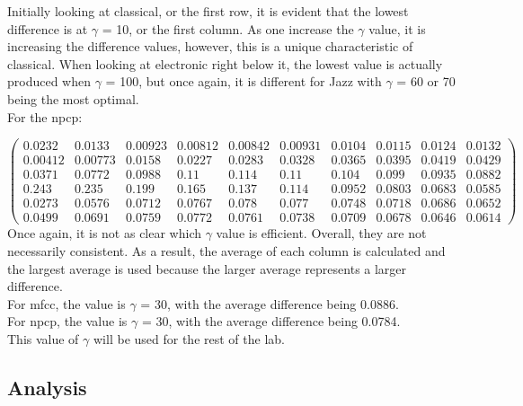 \documentclass[11pt, a4paper]{article}
\begin{document}
Initially looking at classical, or the first row, it is evident that the lowest difference is at $\gamma$ = 10, or the first column. As one increase the $\gamma$ value, it is increasing the difference values, however, this is a unique characteristic of classical. When looking at electronic right below it, the lowest value is actually produced when $\gamma$ = 100, but once again, it is different for Jazz with $\gamma$ = 60 or 70 being the most optimal. \\

For the npcp:

$\left(\begin{array}{cccccccccc} 0.0232 & 0.0133 & 0.00923 & 0.00812 & 0.00842 & 0.00931 & 0.0104 & 0.0115 & 0.0124 & 0.0132\\ 0.00412 & 0.00773 & 0.0158 & 0.0227 & 0.0283 & 0.0328 & 0.0365 & 0.0395 & 0.0419 & 0.0429\\ 0.0371 & 0.0772 & 0.0988 & 0.11 & 0.114 & 0.11 & 0.104 & 0.099 & 0.0935 & 0.0882\\ 0.243 & 0.235 & 0.199 & 0.165 & 0.137 & 0.114 & 0.0952 & 0.0803 & 0.0683 & 0.0585\\ 0.0273 & 0.0576 & 0.0712 & 0.0767 & 0.078 & 0.077 & 0.0748 & 0.0718 & 0.0686 & 0.0652\\ 0.0499 & 0.0691 & 0.0759 & 0.0772 & 0.0761 & 0.0738 & 0.0709 & 0.0678 & 0.0646 & 0.0614 \end{array}\right)$\\

Once again, it is not as clear which $\gamma$ value is efficient. Overall, they are not necessarily consistent. As a result, the average of each column is calculated and the largest average is used because the larger average represents a larger difference. \\

For mfcc, the value is $\gamma$ = 30, with the average difference being 0.0886.\\
For npcp, the value is $\gamma$ = 30, with the average difference being 0.0784.\\

This value of $\gamma$ will be used for the rest of the lab. \\


\subsection{Analysis}
\end{document}
